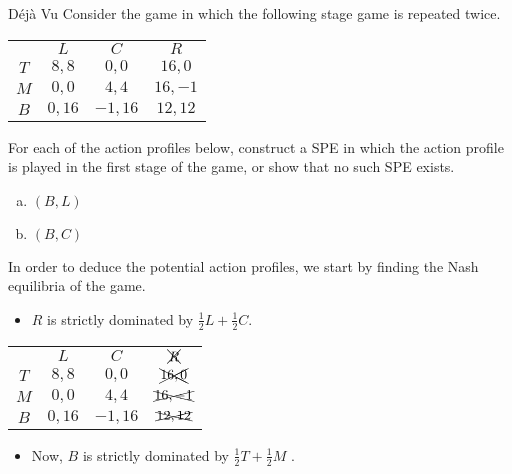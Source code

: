 \documentclass[8pt]{extarticle}
\title{}
\author{Avinash Iyer}
\date{}
\begin{document}
  \renewcommand{\arraystretch}{1.75}
  \begin{problem}{Déjà Vu}
    Consider the game in which the following stage game is repeated twice.
    \begin{center}
      \begin{tabular}{c|c|c|c|}
        \multicolumn{1}{c}{} & \multicolumn{1}{c}{$L$} & \multicolumn{1}{c}{$C$} & \multicolumn{1}{c}{$R$}\\
        \cline{2-4}
        $T$ & $8,8$ & $0,0$ & $16,0$\\
        \cline{2-4}
        $M$ & $0,0$ & $4,4$ & $16,-1$\\
        \cline{2-4}
        $B$ & $0,16$ & $-1,16$ & $12,12$\\
        \cline{2-4}
      \end{tabular}
    \end{center}
    For each of the action profiles below, construct a SPE in which the action profile is played in the first stage of the game, or show that no such SPE exists.
    \begin{enumerate}[(a)]
      \item $(B,L)$
      \item $(B,C)$
    \end{enumerate}
    \tcblower
    In order to deduce the potential action profiles, we start by finding the Nash equilibria of the game.
    \begin{itemize}
      \item $R$ is strictly dominated by $\frac{1}{2}L + \frac{1}{2}C$.
    \end{itemize}
    \begin{center}
      \begin{tabular}{c|c|c|c|}
        \multicolumn{1}{c}{} & \multicolumn{1}{c}{$L$} & \multicolumn{1}{c}{$C$} & \multicolumn{1}{c}{$\xcancel{R}$}\\
        \cline{2-4}
        $T$ & $8,8$ & $0,0$ & $\xcancel{16,0}$\\
        \cline{2-4}
        $M$ & $0,0$ & $4,4$ & $\xcancel{16,-1}$\\
        \cline{2-4}
        $B$ & $0,16$ & $-1,16$ & $\xcancel{12,12}$\\
        \cline{2-4}
      \end{tabular}
    \end{center}
    \begin{itemize}
      \item Now, $B$ is strictly dominated by $\frac{1}{2}T + \frac{1}{2}M$ .
    \end{itemize}

\end{problem}
\end{document}
